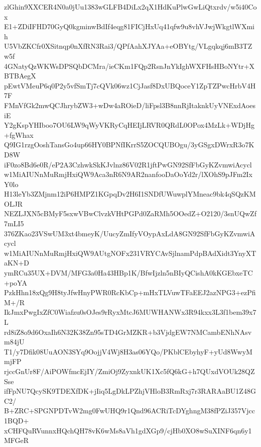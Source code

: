 zlGhin9XXCER4N0a0jUu1383wGLFB4DiLx2qX1HdKuPlwGwLiQtxrdv/w5i40Cox
E1+ZDiIFHD70GyQ0kgminwBdIf4eqg81FICjHxUq41qfw9u8vhVJwjWkgtlWXmih
U5VbZKCfr0XSitnqp0nXfRN3Rai3/QPfAahXJYAa+eOBYtg/VLgqkqj6mB3TZw5f
4GNatyQzWKWsDPSQbDCMra/ieCKm1FQp2RsnJnYkIghWXFHsHBoNYtr+XBTBAegX
pEwtVMeuP6q0P2y5vfSmTj7cQVk06wz1CjJasf8DxUBQoceY1ZpTZPwcHrbV4H7F
FMnVfGk2mwQCJhrybZW3+wDw4aROieD/liFpsl3B8nnRjItaknkUyVNExdAoesiE
Y2gKspYHIboo7OU6LW9qWyVKRyCqHEIjLRVR0QRdL0OPox4MzLk+WDjHg+fgWhax
Q9IG1rzgOoshTansGo4up66HY0BPNfIKrrS5ZOCQUBOgu/3yGSgxDWrxR3o7KD8W
iF0zo8Bd6e0R/eP2A3CzhwkSkKJvlnz86V02R1jftPwGN92SfFbGyKZvmwiAcycl
w1MiAIUNnMuRmjHxiQW9Aca3nR6N9AR2nanfooDaOoYd2r/lXOhS9pJFm2IxY0lo
H13leYb3ZMjnm12iP6HMPZ1KGpqDv2H6I1SNDfUWuwplYMneac9bk4qSQzKMOLJR
NEZLJXN5cBMyF5sxwVBwClvzkVHtPGPd0ZaRMh5OOedZ+O2120/3snUQwZf7mLI5
376ZKao23VSwUM3xt4bmeyK/UucyZmIfyVOypAxLdA8GN92SfFbGyKZvmwiAcycl
w1MiAIUNnMuRmjHxiQW9AUtgNOFx231VRYCAvSjlnamPdpBAdXidt3YnyXTaKN+D
ymRCu35UX+DVM/MFG3a0Ha43HBp1K/BfwIjzln5nBIyQCishA0kKGEbxeTC+poYA
PzkHhn18xQg9H8tyJfwHnyPWR0RcKbCp+mHxTLVuwTFaEEJ2azNPG3+ezPfiM+/R
IkJmxPwgIxZfC0Wiafzu0sOJes9rRyxMtcJ6MUWHANWx3R94kxx3L3f1bem39x7L
rd8iZ8o9d6OxaIh6N32K38Zn95sTD4GrMZKR+b3VjdgEW7NMCambENhNAsvm84jU
T1/y7Dfik08UuAON3SYq9OojjV4Wj8H3as06YQo/PKblCEbyhyF+yUd8WwyMmjFP
rjccGnUr8F/AiPOWfmcEjIY/ZmiOj9ZyxnkUK1Xc5fQ6kG+h7QUxdVOUk28QZSse
ifFpNU7QcySK9TDEXfDK+jIiq5LgDkLPZhjVHloB3RmRxj7r3RARAaBU1Z48GC2/
B+ZRC+SPGNPDTvW2mg0FwUHQ9r1Qnd96ACRiTcDYghngM38fPZiJ357Vjcc1BQD+
xCHFQuRVunnxHQchQH78vK6wMs8aVh1gdXGp9/cjHb0XO8wSuXINF6qn6y1MFGeR
